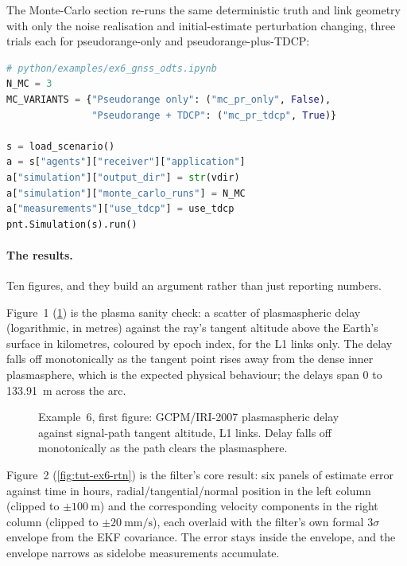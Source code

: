 The Monte-Carlo section re-runs the same deterministic truth and link geometry
with only the noise realisation and initial-estimate perturbation changing,
three trials each for pseudorange-only and pseudorange-plus-TDCP:

\begin{lstlisting}[language=py, caption={A three-trial Monte Carlo for each measurement variant.}, label={lst:tut-ex6-mc}]
# python/examples/ex6_gnss_odts.ipynb
N_MC = 3
MC_VARIANTS = {"Pseudorange only": ("mc_pr_only", False),
               "Pseudorange + TDCP": ("mc_pr_tdcp", True)}

s = load_scenario()
a = s["agents"]["receiver"]["application"]
a["simulation"]["output_dir"] = str(vdir)
a["simulation"]["monte_carlo_runs"] = N_MC
a["measurements"]["use_tdcp"] = use_tdcp
pnt.Simulation(s).run()
\end{lstlisting}

\paragraph{The results.}
Ten figures, and they build an argument rather than just reporting numbers.

Figure~1 (\cref{fig:tut-ex6-delay}) is the plasma sanity check: a scatter of
plasmaspheric delay (logarithmic, in metres) against the ray's tangent altitude
above the Earth's surface in kilometres, coloured by epoch index, for the L1
links only. The delay falls off monotonically as the tangent point rises away
from the dense inner plasmasphere, which is the expected physical behaviour; the
delays span \SI{0}{} to \SI{133.91}{\meter} across the arc.

\begin{figure}[htbp]
  \centering
  \caption{Example~6, first figure: GCPM/IRI-2007 plasmaspheric delay against
           signal-path tangent altitude, L1 links. Delay falls off
           monotonically as the path clears the plasmasphere.}
  \label{fig:tut-ex6-delay}
\end{figure}

Figure~2 (\cref{fig:tut-ex6-rtn}) is the filter's core result: six panels of
estimate error against time in hours, radial/tangential/normal position in the
left column (clipped to $\pm\SI{100}{\meter}$) and the corresponding velocity
components in the right column (clipped to $\pm\SI{20}{\milli\meter\per\second}$),
each overlaid with the filter's own formal $3\sigma$ envelope from the EKF
covariance. The error stays inside the envelope, and the envelope narrows as
sidelobe measurements accumulate.

